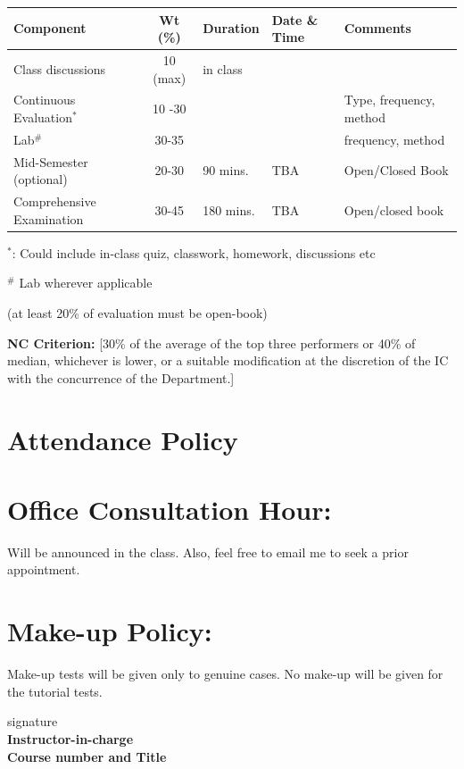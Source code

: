 \documentclass[11pt]{article}
\begin{document}
\begin{sf}
\begin{center}
\renewcommand{\arraystretch}{1.5}
\begin{tabular}{|l|c|m{2cm}|m{2.5cm}|m{4cm}|}
\hline
\textbf{Component}  & \textbf{Wt (\%)}& \textbf{Duration} &  \textbf{Date \& Time} & \textbf{Comments} \\
\hline
Class discussions & 10 (max) & in class &  & \\
\hline
Continuous Evaluation$^*$         & 10 -30 &   &   & Type, frequency, method \\
\hline
Lab$^\#$& 30-35 &   &  & frequency, method \\
\hline
Mid-Semester  (optional) & 20-30 & 90 mins. & TBA & Open/Closed Book \\
\hline
Comprehensive Examination & 30-45 & 180 mins. & TBA & Open/closed book \\
\hline
\end{tabular}
\end{center}
$^*$: Could include in-class quiz, classwork, homework, discussions etc 

$^\#$ Lab wherever applicable

(at least 20\% of evaluation must be open-book)

\noindent
\textbf{NC Criterion:} [30\% of the average of the top three performers or 40\% of median, whichever is lower, or a suitable modification at the discretion of the IC with the concurrence of the Department.]
\\
\section{Attendance Policy}

\section{Office Consultation Hour:}
Will be announced in the class. Also, feel free to email me to seek a prior appointment.

\section{Make-up Policy:}
Make-up tests will be given only to genuine cases. No make-up will be given for the tutorial tests.

\vspace{1em}
\begin{flushright}
\parbox[t]{5cm}{
 signature\\
\textbf{Instructor-in-charge}\\
\textbf{Course number and Title}
}
\end{flushright}
\end{sf}
\end{document}
